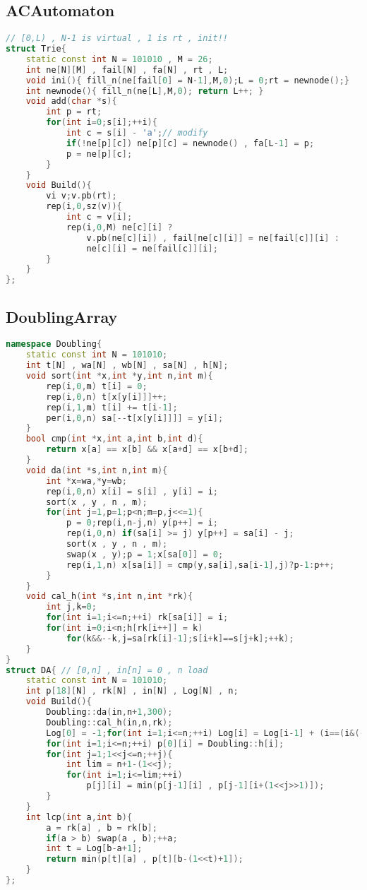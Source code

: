 \subsection{ACAutomaton}
\begin{lstlisting}[language=C++]
// [0,L) , N-1 is virtual , 1 is rt , init!!
struct Trie{
    static const int N = 101010 , M = 26;
    int ne[N][M] , fail[N] , fa[N] , rt , L;
    void ini(){ fill_n(ne[fail[0] = N-1],M,0);L = 0;rt = newnode();}
    int newnode(){ fill_n(ne[L],M,0); return L++; }
    void add(char *s){
        int p = rt;
        for(int i=0;s[i];++i){
            int c = s[i] - 'a';// modify
            if(!ne[p][c]) ne[p][c] = newnode() , fa[L-1] = p;
            p = ne[p][c];
        }
    }
    void Build(){
        vi v;v.pb(rt);
        rep(i,0,sz(v)){
            int c = v[i];
            rep(i,0,M) ne[c][i] ?
                v.pb(ne[c][i]) , fail[ne[c][i]] = ne[fail[c]][i] :
                ne[c][i] = ne[fail[c]][i];
        }
    }
};
\end{lstlisting}
\subsection{DoublingArray}
\begin{lstlisting}[language=C++]
namespace Doubling{
    static const int N = 101010;
    int t[N] , wa[N] , wb[N] , sa[N] , h[N];
    void sort(int *x,int *y,int n,int m){
        rep(i,0,m) t[i] = 0;
        rep(i,0,n) t[x[y[i]]]++;
        rep(i,1,m) t[i] += t[i-1];
        per(i,0,n) sa[--t[x[y[i]]]] = y[i];
    }
    bool cmp(int *x,int a,int b,int d){
        return x[a] == x[b] && x[a+d] == x[b+d];
    }
    void da(int *s,int n,int m){
        int *x=wa,*y=wb;
        rep(i,0,n) x[i] = s[i] , y[i] = i;
        sort(x , y , n , m);
        for(int j=1,p=1;p<n;m=p,j<<=1){
            p = 0;rep(i,n-j,n) y[p++] = i;
            rep(i,0,n) if(sa[i] >= j) y[p++] = sa[i] - j;
            sort(x , y , n , m);
            swap(x , y);p = 1;x[sa[0]] = 0;
            rep(i,1,n) x[sa[i]] = cmp(y,sa[i],sa[i-1],j)?p-1:p++;
        }
    }
    void cal_h(int *s,int n,int *rk){
        int j,k=0;
        for(int i=1;i<=n;++i) rk[sa[i]] = i;
        for(int i=0;i<n;h[rk[i++]] = k)
            for(k&&--k,j=sa[rk[i]-1];s[i+k]==s[j+k];++k);
    }
}
struct DA{ // [0,n] , in[n] = 0 , n load
    static const int N = 101010;
    int p[18][N] , rk[N] , in[N] , Log[N] , n;
    void Build(){
        Doubling::da(in,n+1,300);
        Doubling::cal_h(in,n,rk);
        Log[0] = -1;for(int i=1;i<=n;++i) Log[i] = Log[i-1] + (i==(i&(-i)));
        for(int i=1;i<=n;++i) p[0][i] = Doubling::h[i];
        for(int j=1;1<<j<=n;++j){
            int lim = n+1-(1<<j);
            for(int i=1;i<=lim;++i)
                p[j][i] = min(p[j-1][i] , p[j-1][i+(1<<j>>1)]);
        }
    }
    int lcp(int a,int b){
        a = rk[a] , b = rk[b];
        if(a > b) swap(a , b);++a;
        int t = Log[b-a+1];
        return min(p[t][a] , p[t][b-(1<<t)+1]);
    }
};
\end{lstlisting}
